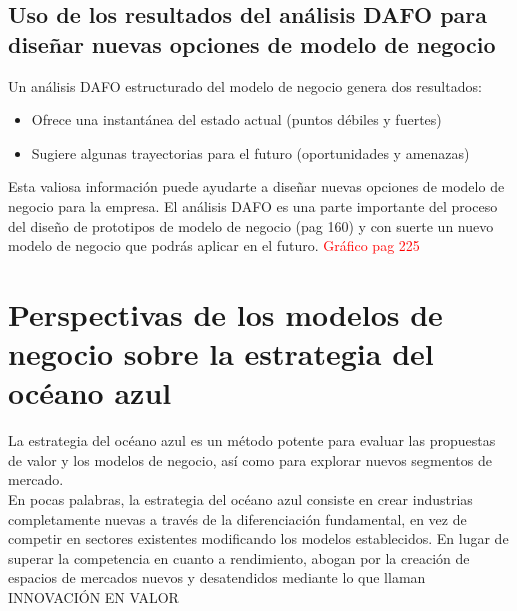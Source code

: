 \documentclass[11pt]{book}
\begin{document}
\section{Uso de los resultados del análisis DAFO para diseñar nuevas opciones de modelo de negocio}
Un análisis DAFO estructurado del modelo de negocio genera dos resultados: 
\begin{itemize}
\item Ofrece una instantánea del estado actual (puntos débiles y fuertes)
\item Sugiere algunas trayectorias para el futuro (oportunidades y amenazas) 
\end{itemize}
Esta valiosa información puede ayudarte a diseñar nuevas opciones de modelo de negocio para la empresa.
El análisis DAFO es una parte importante del proceso del diseño de prototipos de modelo de negocio (pag 160) y con suerte un nuevo modelo de negocio que podrás aplicar en el futuro.
\textcolor{red}{Gráfico pag 225}
\chapter{Perspectivas de los modelos de negocio sobre la estrategia del océano azul}
La estrategia del océano azul es un método potente para evaluar las propuestas de valor y los modelos de negocio, así como para explorar nuevos segmentos de mercado.
\\ En pocas palabras, la estrategia del océano azul consiste en crear industrias completamente nuevas a través de la diferenciación fundamental, en vez de competir en sectores existentes modificando los modelos establecidos. 
En lugar de superar la competencia en cuanto a rendimiento, abogan por la creación de espacios de mercados nuevos y desatendidos mediante lo que llaman INNOVACIÓN EN VALOR
\end{document}
